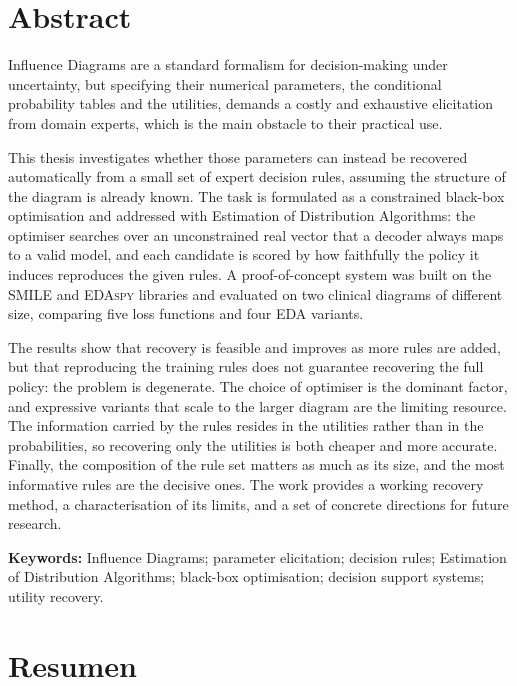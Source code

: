 \chapter*{Abstract}

Influence Diagrams are a standard formalism for decision-making under
uncertainty, but specifying their numerical parameters, the conditional
probability tables and the utilities, demands a costly and exhaustive elicitation
from domain experts, which is the main obstacle to their practical use. 

This
thesis investigates whether those parameters can instead be recovered
automatically from a small set of expert decision rules, assuming the structure
of the diagram is already known. The task is formulated as a constrained
black-box optimisation and addressed with Estimation of Distribution Algorithms:
the optimiser searches over an unconstrained real vector that a decoder always
maps to a valid model, and each candidate is scored by how faithfully the policy
it induces reproduces the given rules. A proof-of-concept system was built on the
\textsc{SMILE} and \textsc{EDAspy} libraries and evaluated on two clinical
diagrams of different size, comparing five loss functions and four EDA variants.


The results show that recovery is feasible and improves as more rules are added,
but that reproducing the training rules does not guarantee recovering the full
policy: the problem is degenerate. The choice of optimiser is the dominant
factor, and expressive variants that scale to the larger diagram are the
limiting resource. The information carried by the rules resides in the utilities
rather than in the probabilities, so recovering only the utilities is both
cheaper and more accurate. Finally, the composition of the rule set matters as
much as its size, and the most informative rules are the decisive ones. The work
provides a working recovery method, a characterisation of its limits, and a set
of concrete directions for future research.

\vspace{1em}
\noindent\textbf{Keywords:} Influence Diagrams; parameter elicitation; decision
rules; Estimation of Distribution Algorithms; black-box optimisation; decision
support systems; utility recovery.



\newpage

\chapter*{Resumen}

